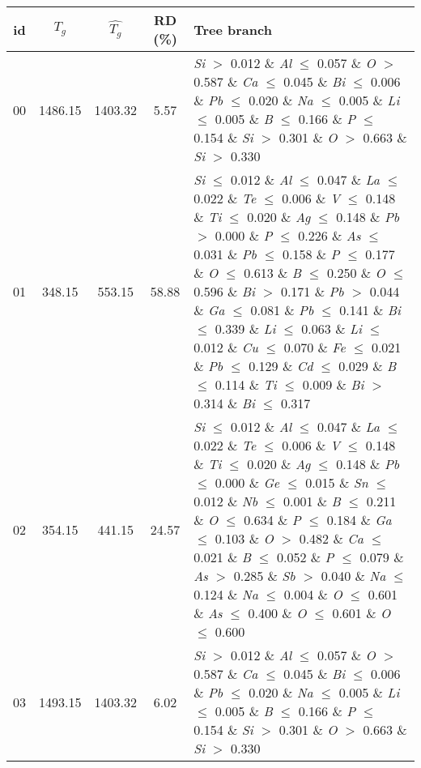 \begin{table}[!htbp]
	\setlength{\tabcolsep}{3pt}
	\begin{tabular}{ccccp{}}
		\toprule
		id & $T_g$ & $\hat{T_g}$ & RD (\%) & Tree branch\\
		\midrule
		00 & 1486.15 & 1403.32 & 5.57 & \textit{Si} $>$ 0.012 $\&$ \textit{Al} $\le$ 0.057 $\&$ \textit{O} $>$ 0.587 $\&$ \textit{Ca} $\le$ 0.045 $\&$ \textit{Bi} $\le$ 0.006 $\&$ \textit{Pb} $\le$ 0.020 $\&$ \textit{Na} $\le$ 0.005 $\&$ \textit{Li} $\le$ 0.005 $\&$ \textit{B} $\le$ 0.166 $\&$ \textit{P} $\le$ 0.154 $\&$ \textit{Si} $>$ 0.301 $\&$ \textit{O} $>$ 0.663 $\&$ \textit{Si} $>$ 0.330\\
		\hline
		01 & 348.15 & 553.15 & 58.88 & \textit{Si} $\le$ 0.012 $\&$ \textit{Al} $\le$ 0.047 $\&$ \textit{La} $\le$ 0.022 $\&$ \textit{Te} $\le$ 0.006 $\&$ \textit{V} $\le$ 0.148 $\&$ \textit{Ti} $\le$ 0.020 $\&$ \textit{Ag} $\le$ 0.148 $\&$ \textit{Pb} $>$ 0.000 $\&$ \textit{P} $\le$ 0.226 $\&$ \textit{As} $\le$ 0.031 $\&$ \textit{Pb} $\le$ 0.158 $\&$ \textit{P} $\le$ 0.177 $\&$ \textit{O} $\le$ 0.613 $\&$ \textit{B} $\le$ 0.250 $\&$ \textit{O} $\le$ 0.596 $\&$ \textit{Bi} $>$ 0.171 $\&$ \textit{Pb} $>$ 0.044 $\&$ \textit{Ga} $\le$ 0.081 $\&$ \textit{Pb} $\le$ 0.141 $\&$ \textit{Bi} $\le$ 0.339 $\&$ \textit{Li} $\le$ 0.063 $\&$ \textit{Li} $\le$ 0.012 $\&$ \textit{Cu} $\le$ 0.070 $\&$ \textit{Fe} $\le$ 0.021 $\&$ \textit{Pb} $\le$ 0.129 $\&$ \textit{Cd} $\le$ 0.029 $\&$ \textit{B} $\le$ 0.114 $\&$ \textit{Ti} $\le$ 0.009 $\&$ \textit{Bi} $>$ 0.314 $\&$ \textit{Bi} $\le$ 0.317\\
		\hline
		02 & 354.15 & 441.15 & 24.57 & \textit{Si} $\le$ 0.012 $\&$ \textit{Al} $\le$ 0.047 $\&$ \textit{La} $\le$ 0.022 $\&$ \textit{Te} $\le$ 0.006 $\&$ \textit{V} $\le$ 0.148 $\&$ \textit{Ti} $\le$ 0.020 $\&$ \textit{Ag} $\le$ 0.148 $\&$ \textit{Pb} $\le$ 0.000 $\&$ \textit{Ge} $\le$ 0.015 $\&$ \textit{Sn} $\le$ 0.012 $\&$ \textit{Nb} $\le$ 0.001 $\&$ \textit{B} $\le$ 0.211 $\&$ \textit{O} $\le$ 0.634 $\&$ \textit{P} $\le$ 0.184 $\&$ \textit{Ga} $\le$ 0.103 $\&$ \textit{O} $>$ 0.482 $\&$ \textit{Ca} $\le$ 0.021 $\&$ \textit{B} $\le$ 0.052 $\&$ \textit{P} $\le$ 0.079 $\&$ \textit{As} $>$ 0.285 $\&$ \textit{Sb} $>$ 0.040 $\&$ \textit{Na} $\le$ 0.124 $\&$ \textit{Na} $\le$ 0.004 $\&$ \textit{O} $\le$ 0.601 $\&$ \textit{As} $\le$ 0.400 $\&$ \textit{O} $\le$ 0.601 $\&$ \textit{O} $\le$ 0.600\\
		\hline
		03 & 1493.15 & 1403.32 & 6.02 & \textit{Si} $>$ 0.012 $\&$ \textit{Al} $\le$ 0.057 $\&$ \textit{O} $>$ 0.587 $\&$ \textit{Ca} $\le$ 0.045 $\&$ \textit{Bi} $\le$ 0.006 $\&$ \textit{Pb} $\le$ 0.020 $\&$ \textit{Na} $\le$ 0.005 $\&$ \textit{Li} $\le$ 0.005 $\&$ \textit{B} $\le$ 0.166 $\&$ \textit{P} $\le$ 0.154 $\&$ \textit{Si} $>$ 0.301 $\&$ \textit{O} $>$ 0.663 $\&$ \textit{Si} $>$ 0.330\\

\end{tabular}
\end{table}
